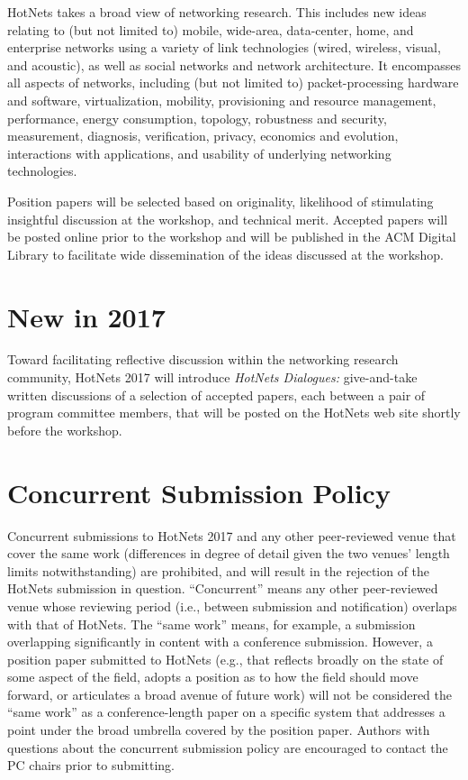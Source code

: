 \documentclass{hotnets17}
\begin{document}
HotNets takes a broad view of networking research. This includes new
ideas relating to (but not limited to) mobile, wide-area, data-center,
home, and enterprise networks using a variety of link technologies
(wired, wireless, visual, and acoustic), as well as social networks
and network architecture. It encompasses all aspects of networks,
including (but not limited to) packet-processing hardware and
software, virtualization, mobility, provisioning and resource
management, performance, energy consumption, topology, robustness and
security, measurement, diagnosis, verification, privacy, economics and
evolution, interactions with applications, and usability of underlying
networking technologies.

Position papers will be selected based on originality, likelihood of
stimulating insightful discussion at the workshop, and technical
merit. Accepted papers will be posted online prior to the workshop and
will be published in the ACM Digital Library to facilitate wide
dissemination of the ideas discussed at the workshop.

\section{New in 2017}

Toward facilitating reflective discussion within the networking
research community, HotNets 2017 will introduce {\it HotNets Dialogues:}
give-and-take written discussions of a selection of accepted papers,
each between a pair of program committee members, that will be posted
on the HotNets web site shortly before the workshop.

\section{Concurrent Submission Policy}

Concurrent submissions to HotNets 2017 and any other peer-reviewed
venue that cover the same work (differences in degree of detail given
the two venues' length limits notwithstanding) are prohibited, and
will result in the rejection of the HotNets submission in
question. ``Concurrent'' means any other peer-reviewed venue whose
reviewing period (i.e., between submission and notification) overlaps
with that of HotNets. The ``same work'' means, for example, a submission
overlapping significantly in content with a conference
submission. However, a position paper submitted to HotNets (e.g., that
reflects broadly on the state of some aspect of the field, adopts a
position as to how the field should move forward, or articulates a
broad avenue of future work) will not be considered the ``same work'' as
a conference-length paper on a specific system that addresses a point
under the broad umbrella covered by the position paper. Authors with
questions about the concurrent submission policy are encouraged to
contact the PC chairs prior to submitting.
\end{document}
